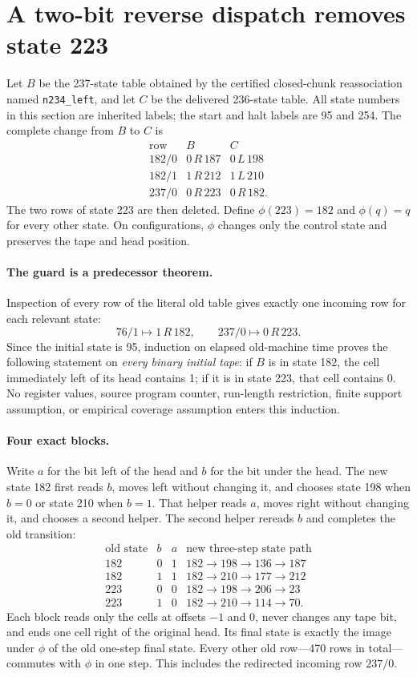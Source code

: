 \section{A two-bit reverse dispatch removes state 223}
\label{sec:fold236}

Let $B$ be the 237-state table obtained by the certified closed-chunk
reassociation named \texttt{n234\_left}, and let $C$ be the delivered
236-state table. All state numbers in this section are inherited labels;
the start and halt labels are 95 and 254. The complete change from $B$ to
$C$ is
\[
\begin{array}{c|c|c}
\text{row}&B&C\\\hline
182/0&0\,R\,187&0\,L\,198\\
182/1&1\,R\,212&1\,L\,210\\
237/0&0\,R\,223&0\,R\,182.
\end{array}
\]
The two rows of state 223 are then deleted. Define $\phi(223)=182$ and
$\phi(q)=q$ for every other state. On configurations, $\phi$ changes only
the control state and preserves the tape and head position.

\paragraph{The guard is a predecessor theorem.}
Inspection of every row of the literal old table gives exactly one
incoming row for each relevant state:
\[
76/1\longmapsto 1\,R\,182,
\qquad
237/0\longmapsto 0\,R\,223.
\]
Since the initial state is 95, induction on elapsed old-machine time
proves the following statement on \emph{every binary initial tape}:
if $B$ is in state 182, the cell immediately left of its head contains 1;
if it is in state 223, that cell contains 0. No register values, source
program counter, run-length restriction, finite support assumption, or
empirical coverage assumption enters this induction.

\paragraph{Four exact blocks.}
Write $a$ for the bit left of the head and $b$ for the bit under the head.
The new state 182 first reads $b$, moves left without changing it, and
chooses state 198 when $b=0$ or state 210 when $b=1$. That helper reads
$a$, moves right without changing it, and chooses a second helper. The
second helper rereads $b$ and completes the old transition:
\[
\begin{array}{c|c|c|l}
\text{old state}&b&a&\text{new three-step state path}\\\hline
182&0&1&182\to198\to136\to187\\
182&1&1&182\to210\to177\to212\\
223&0&0&182\to198\to206\to23\\
223&1&0&182\to210\to114\to70.
\end{array}
\]
Each block reads only the cells at offsets $-1$ and $0$, never changes
any tape bit, and ends one cell right of the original head. Its final
state is exactly the image under $\phi$ of the old one-step final state.
Every other old row---470 rows in total---commutes with $\phi$ in one
step. This includes the redirected incoming row $237/0$.

